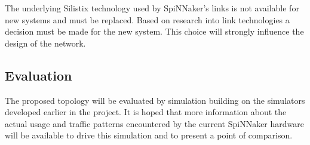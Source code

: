 			
			The underlying Silistix technology used by SpiNNaker's links is not
			available for new systems and must be replaced. Based on research into
			link technologies a decision must be made for the new system. This choice
			will strongly influence the design of the network.
		
		
		\subsection{Evaluation}
			
			The proposed topology will be evaluated by simulation building on the
			simulators developed earlier in the project. It is hoped that more
			information about the actual usage and traffic patterns encountered by the
			current SpiNNaker hardware will be available to drive this simulation and
			to present a point of comparison.
		
